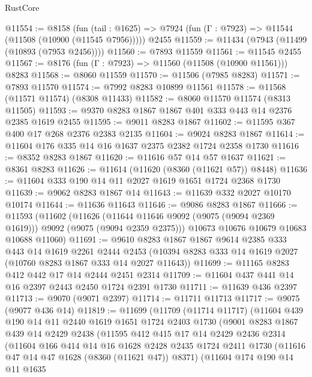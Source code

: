 \begin{lexlean}{RustCore}
\begin{coremodule}
@11554 := @8158
    (fun (tail : @1625) => @7924 (fun (Γ : @7923) => @11544 (@11508 (@10900 (@11545 @7956)))))
    @2455
@11559 := @11434 (@7943 (@11499 (@10893 (@7953 @2456))))
@11560 := @7893 @11559
@11561 := @11545 @2455
@11567 := @8176 (fun (Γ : @7923) => @11560 (@11508 (@10900 @11561))) @8283
@11568 := @8060 @11559
@11570 := @11506 (@7985 @8283)
@11571 := @7893 @11570
@11574 := @7992 @8283 @10899 @11561
@11578 := @11568 (@11571 @11574) (@8308 @11433)
@11582 := @8060 @11570 @11574 (@8313 @11505)
@11593 := @9370 @8283 @1867 @1867 @401 @333 @443 @14 @2376 @2385 @1619 @2455
@11595 := @9011 @8283 @1867
@11602 := @11595 @367 @400 @17 @268 @2376 @2383 @2135
@11604 := @9024 @8283 @1867
@11614 := @11604 @176 @335 @14 @16 @1637 @2375 @2382 @1724 @2358 @1730
@11616 := @8352 @8283 @1867
@11620 := @11616 @57 @14 @57 @1637
@11621 := @8361 @8283
@11626 := @11614 (@11620 (@8360 (@11621 @57)) @8448)
@11636 := @11604 @333 @190 @14 @11 @2027 @1619 @1651 @1724 @2368 @1730
@11639 := @9062 @8283 @1867 @14
@11643 := @11639 @332 @2027 @10170 @10174
@11644 := @11636 @11643
@11646 := @9086 @8283 @1867
@11666 := @11593
    (@11602
      (@11626 (@11644 @11646 @9092 (@9075 (@9094 @2369 @1619))) @9092 (@9075 (@9094 @2359 @2375)))
      @10673
      @10676
      @10679
      @10683
      @10688
      @11060)
@11691 := @9610
    @8283
    @1867
    @1867
    @9614
    @2385
    @333
    @443
    @14
    @1619
    @2261
    @2444
    @2453
    (@10394 @8283 @333 @14 @1619 @2027 (@10760 @8283 @1867 @333 @14 @2027 @11643))
@11699 := @11165 @8283 @412 @442 @17 @14 @2444 @2451 @2314
@11709 := @11604 @437 @441 @14 @16 @2397 @2443 @2450 @1724 @2391 @1730
@11711 := @11639 @436 @2397
@11713 := @9070 (@9071 @2397)
@11714 := @11711 @11713
@11717 := @9075 (@9077 @436 @14)
@11819 := @11699
    (@11709
      (@11714 @11717)
      (@11604
        @439
        @190
        @14
        @11
        @2440
        @1619
        @1651
        @1724
        @2403
        @1730
        (@9001
          @8283
          @1867
          @439
          @14
          @2429
          @2438
          (@11595
            @412
            @415
            @17
            @14
            @2429
            @2436
            @2314
            (@11604
              @166
              @414
              @14
              @16
              @1628
              @2428
              @2435
              @1724
              @2411
              @1730
              (@11616 @47 @14 @47 @1628 (@8360 (@11621 @47)) @8371)
              (@11604
                @174
                @190
                @14
                @11
                @1635

\end{coremodule}
\end{lexlean}

